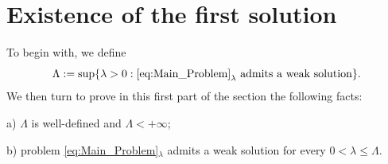 \documentclass[11pt]{amsart}
\numberwithin{equation}{section} %
\theoremstyle{definition}
\begin{document}
\section{Existence of the first solution}\label{sec:First_Solution}
To begin with, we define
\begin{equation}\label{eq:DefinitionLambda}
	\Lambda := \sup \{ \lambda >0: \eqref{eq:Main_Problem}_\lambda \textrm{ admits a weak solution}\}.
\end{equation}
We then turn to prove in this first part of the section the following facts:
\vspace*{0.1cm}

a)\,\,$\Lambda$ is well-defined and $\Lambda < +\infty$;
\vspace*{0.05cm}

b)\,\,problem \eqref{eq:Main_Problem}$_\lambda$ admits a weak solution for every $0<\lambda\leq \Lambda$.
\vspace*{0.1cm}
\end{document}
